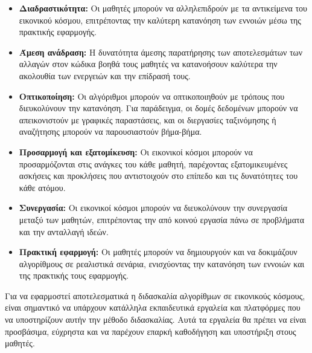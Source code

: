 \begin{itemize}
    \item \textbf{Διαδραστικότητα:} Οι μαθητές μπορούν να αλληλεπιδρούν με τα αντικείμενα του εικονικού κόσμου, επιτρέποντας την καλύτερη κατανόηση των εννοιών μέσω της πρακτικής εφαρμογής.
    \item \textbf{Άμεση ανάδραση:} Η δυνατότητα άμεσης παρατήρησης των αποτελεσμάτων των αλλαγών στον κώδικα βοηθά τους μαθητές να κατανοήσουν καλύτερα την ακολουθία των ενεργειών και την επίδρασή τους.
    \item \textbf{Οπτικοποίηση:} Οι αλγόριθμοι μπορούν να οπτικοποιηθούν με τρόπους που διευκολύνουν την κατανόηση. Για παράδειγμα, οι δομές δεδομένων μπορούν να απεικονιστούν με γραφικές παραστάσεις, και οι διεργασίες ταξινόμησης ή αναζήτησης μπορούν να παρουσιαστούν βήμα-βήμα.
    \item \textbf{Προσαρμογή και εξατομίκευση:} Οι εικονικοί κόσμοι μπορούν να προσαρμόζονται στις ανάγκες του κάθε μαθητή, παρέχοντας εξατομικευμένες ασκήσεις και προκλήσεις που αντιστοιχούν στο επίπεδο και τις δυνατότητες του κάθε ατόμου.
    \item \textbf{Συνεργασία:} Οι εικονικοί κόσμοι μπορούν να διευκολύνουν την συνεργασία μεταξύ των μαθητών, επιτρέποντας την από κοινού εργασία πάνω σε προβλήματα και την ανταλλαγή ιδεών.
    \item \textbf{Πρακτική εφαρμογή:} Οι μαθητές μπορούν να δημιουργούν και να δοκιμάζουν αλγορίθμους σε ρεαλιστικά σενάρια, ενισχύοντας την κατανόηση των εννοιών και της πρακτικής τους εφαρμογής\cite{damasevicius_virtual_2024,rossiou_using_2009}.
\end{itemize}

Για να εφαρμοστεί αποτελεσματικά η διδασκαλία αλγορίθμων σε εικονικούς κόσμους, είναι σημαντικό να υπάρχουν κατάλληλα εκπαιδευτικά εργαλεία και πλατφόρμες που να υποστηρίζουν αυτήν την μέθοδο διδασκαλίας. Αυτά τα εργαλεία θα πρέπει να είναι προσβάσιμα, εύχρηστα και να παρέχουν επαρκή καθοδήγηση και υποστήριξη στους μαθητές.
